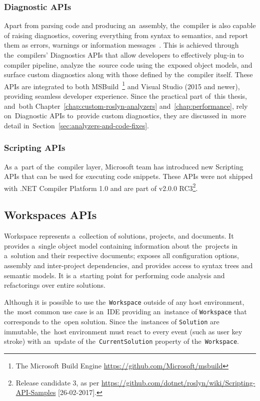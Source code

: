 \documentclass[
  digital, %
  table,   %
  lof,     %
  lot,     %
  oneside,
]{fithesis3}
\begin{document}
\subsubsection{\textbf{Diagnostic APIs}}
Apart from parsing code and producing an~assembly, the~compiler is also capable of raising diagnostics, covering everything from syntax to semantics, and report them as errors, warnings or information messages~\cite{roslyn-succinctly}. This is achieved through the~compilers' Diagnostics APIs that allow developers to effectively plug-in to compiler pipeline, analyze the~source code using the~exposed object models, and surface custom diagnostics along with those defined by the~compiler itself. These APIs are integrated to both MSBuild~\footnote{The Microsoft Build Engine \url{https://github.com/Microsoft/msbuild}} and Visual Studio (2015 and newer), providing seamless developer experience. Since the practical part of~this thesis, and~both Chapter~\ref{chap:custom-roslyn-analyzers} and~\ref{chap:performance}, rely on~Diagnostic APIs to~provide custom diagnostics, they are discussed in~more detail in~Section~\ref{sec:analyzers-and-code-fixes}.

\subsubsection{\textbf{Scripting APIs}}
As a~part of the~compiler layer, Microsoft team has introduced new Scripting APIs that can be used for executing code snippets. These APIs were not shipped with .NET Compiler Platform 1.0 and are part of v2.0.0 RC3\footnote{Release candidate 3, as per \url{https://github.com/dotnet/roslyn/wiki/Scripting-API-Samples} [26-02-2017].}.

\subsection{Workspaces APIs}
Workspace represents a~collection of solutions, projects, and documents. It provides a~single object model containing information about the~projects in a~solution and their respective documents; exposes all configuration options, assembly and inter-project dependencies, and provides access to syntax trees and semantic models. It is a~starting point for performing code analysis and refactorings over entire solutions.

Although it is possible to use the~\texttt{Workspace} outside of any host environment, the~most common use case is an~IDE providing an~instance of \texttt{Workspace} that corresponds to the~open solution. Since the~instances of \texttt{Solution} are immutable, the~host environment must react to every event (such as user key stroke) with an~update of the~\texttt{CurrentSolution} property of the~\texttt{Workspace}.
\end{document}
